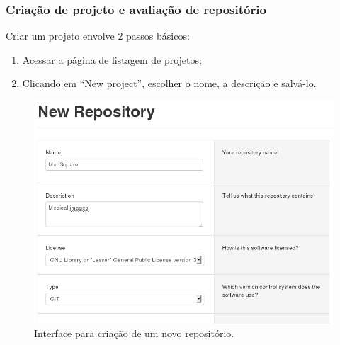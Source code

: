 \documentclass{llncs}
\begin{document}
    \subsubsection{Criação de projeto e avaliação de repositório}
    Criar um projeto envolve 2 passos básicos:
    \begin{enumerate}
      \item Acessar a página de listagem de projetos;
      \item Clicando em ``New project'', escolher o nome, a descrição e salvá-lo.
    \end{enumerate}

    \begin{figure}[H]
      \centering
      \includegraphics[width=\textwidth]{images/new-repository.png}
      \caption{Interface para criação de um novo repositório.}
      \label{fig:new-repository}
    \end{figure}
\end{document}
